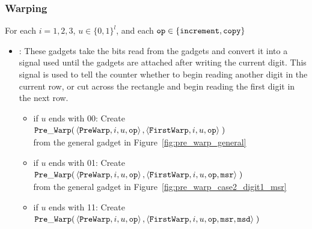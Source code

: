 \subsubsection{ Warping }

    For each $i = 1, 2, 3$, $u \in \{0, 1\}^l$, and each ${\tt op} \in \{ {\tt increment, copy } \}$


    \begin{itemize}
        \item {\prewarp}: These gadgets take the bits read from the {\dreader} gadgets and convert it into
                          a signal used until the {\dtop} gadgets are attached after writing the current digit. This signal is
                          used to tell the counter whether to begin reading another digit in the current row,
                          or cut across the rectangle and begin reading the first digit in the next row.


            \begin{itemize}

            \item if $u$ ends with 00:
            Create
            $\begin{aligned}[t]
                {\tt Pre\_Warp}(& \left\langle {\tt PreWarp},   i, u, {\tt op} \right\rangle,
                           \left\langle {\tt FirstWarp}, i, u, {\tt op} \right\rangle \;)
            \end{aligned}$ \\ from the general gadget in Figure~\ref{fig:pre_warp_general}

            \item if $u$ ends with 01:
            Create
            $\begin{aligned}[t]
                {\tt Pre\_Warp}(& \left\langle {\tt PreWarp},   i, u, {\tt op} \right\rangle,
                           \left\langle {\tt FirstWarp}, i, u, {\tt op}, {\tt msr} \right\rangle \;)
            \end{aligned}$ \\ from the general gadget in Figure~\ref{fig:pre_warp_case2_digit1_msr}

            \item if $u$ ends with 11:
            Create
            $\begin{aligned}[t]
                {\tt Pre\_Warp}(& \left\langle {\tt PreWarp},   i, u, {\tt op} \right\rangle,
                           \left\langle {\tt FirstWarp}, i, u, {\tt op}, {\tt msr}, {\tt msd} \right\rangle \;)
            \end{aligned}$


\end{itemize}
\end{itemize}
